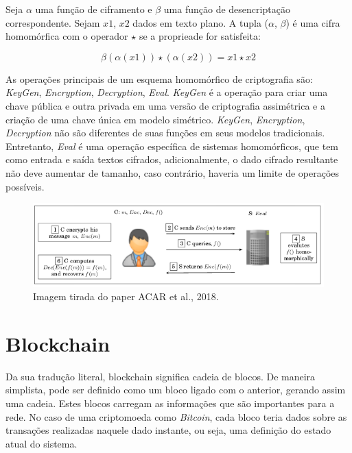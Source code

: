 \documentclass{ufsctex/ufsctex}
\begin{document}
Seja $\alpha$ uma função de ciframento e $\beta$ uma função de desencriptação
correspondente. Sejam $x1$, $x2$ dados em texto plano. A tupla ($\alpha$,
$\beta$) é uma cifra homomórfica com o operador $\star$ se a proprieade for
satisfeita:

\begin{equation}
\beta (\alpha(x1)) \star (\alpha(x2)) = x1 \star x2
\end{equation}

As operações principais de um esquema homomórfico de criptografia são:
\textit{KeyGen}, \textit{Encryption}, \textit{Decryption}, \textit{Eval}.
\textit{KeyGen} é a operação para criar uma chave pública e outra privada em uma
versão de criptografia assimétrica e a criação de uma chave única em modelo
simétrico. \textit{KeyGen}, \textit{Encryption}, \textit{Decryption} não são
diferentes de suas funções em seus modelos tradicionais.  Entretanto,
\textit{Eval} é uma operação específica de sistemas homomórficos, que tem como
entrada e saída textos cifrados, adicionalmente, o dado cifrado resultante não
deve aumentar de tamanho, caso contrário, haveria um limite de operações
possíveis.\cite{survey-homo}

\begin{figure}[h]
	\centering
	\includegraphics[scale=0.4]{crypto-homo}
	\caption{Imagem tirada do paper ACAR et al., 2018.}
	\label{fig:crypto-homo}
\end{figure}


\section{Blockchain}

Da sua tradução literal, blockchain significa cadeia de blocos. De  maneira
simplista, pode ser definido como um bloco ligado com o anterior, gerando assim
uma cadeia. Estes blocos carregam as informações que são importantes para a
rede. No caso de uma criptomoeda como \textit{Bitcoin}, cada bloco teria dados
sobre as transações realizadas naquele dado instante, ou seja, uma definição do
estado atual do sistema.
\end{document}
